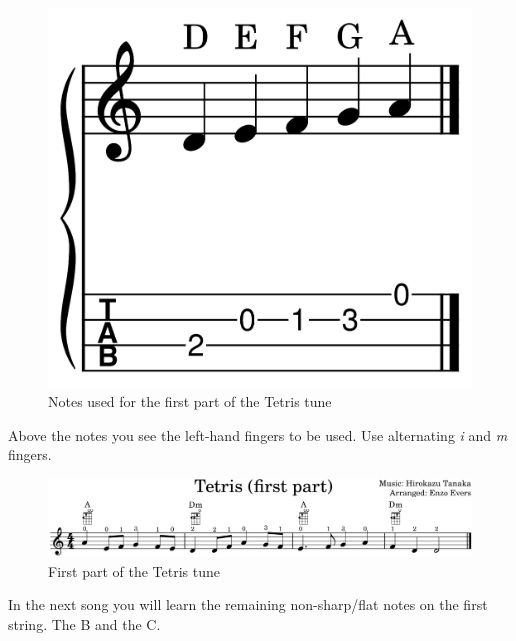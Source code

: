 \begin{figure}[h]
	\centering
	\includegraphics[height=0.12\textheight]{../../MuseScore/Ukulele/UkuleleNotesUsedInTetrisFirstPart.png}
	\caption{Notes used for the first part of the Tetris tune}
	\label{fig:ukulele_notes_for_tetris_first_part}
\end{figure}

Above the notes you see the left-hand fingers to be used. Use alternating \textit{i} and \textit{m} fingers.

\begin{figure}[h]
	\centering
	\includegraphics[width=\textwidth]{../../MuseScore/Ukulele/UkuleleTetrisFirstPart.png}
	\caption{First part of the Tetris tune}
	\label{fig:ukulele_tetris_simple_first_part}
\end{figure}



\newpage

In the next song you will learn the remaining non-sharp/flat notes on the first string. The B and the C.

